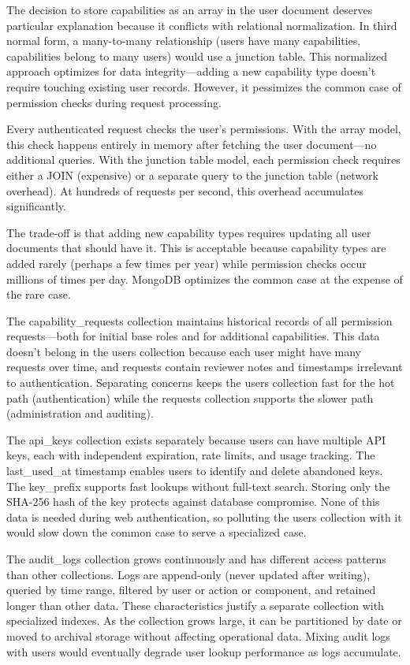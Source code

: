 \documentclass[12pt,a4paper]{article}
\begin{document}
The decision to store capabilities as an array in the user document deserves particular explanation because it conflicts with relational normalization. In third normal form, a many-to-many relationship (users have many capabilities, capabilities belong to many users) would use a junction table. This normalized approach optimizes for data integrity—adding a new capability type doesn't require touching existing user records. However, it pessimizes the common case of permission checks during request processing.


Every authenticated request checks the user's permissions. With the array model, this check happens entirely in memory after fetching the user document—no additional queries. With the junction table model, each permission check requires either a JOIN (expensive) or a separate query to the junction table (network overhead). At hundreds of requests per second, this overhead accumulates significantly.

The trade-off is that adding new capability types requires updating all user documents that should have it. This is acceptable because capability types are added rarely (perhaps a few times per year) while permission checks occur millions of times per day. MongoDB optimizes the common case at the expense of the rare case.

The capability\_requests collection maintains historical records of all permission requests—both for initial base roles and for additional capabilities. This data doesn't belong in the users collection because each user might have many requests over time, and requests contain reviewer notes and timestamps irrelevant to authentication. Separating concerns keeps the users collection fast for the hot path (authentication) while the requests collection supports the slower path (administration and auditing).

The api\_keys collection exists separately because users can have multiple API keys, each with independent expiration, rate limits, and usage tracking. The last\_used\_at timestamp enables users to identify and delete abandoned keys. The key\_prefix supports fast lookups without full-text search. Storing only the SHA-256 hash of the key protects against database compromise. None of this data is needed during web authentication, so polluting the users collection with it would slow down the common case to serve a specialized case.

The audit\_logs collection grows continuously and has different access patterns than other collections. Logs are append-only (never updated after writing), queried by time range, filtered by user or action or component, and retained longer than other data. These characteristics justify a separate collection with specialized indexes. As the collection grows large, it can be partitioned by date or moved to archival storage without affecting operational data. Mixing audit logs with users would eventually degrade user lookup performance as logs accumulate.
\end{document}
